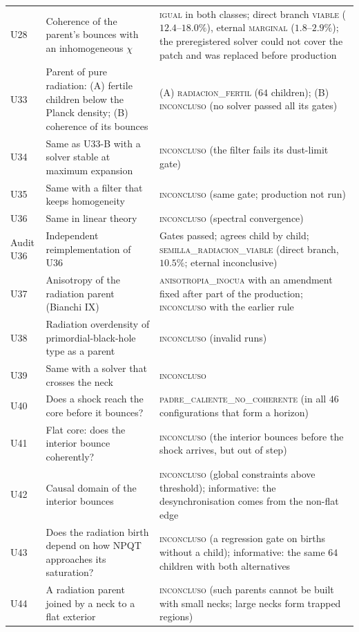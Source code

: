 \documentclass[11pt,a4paper]{article}
\begin{document}
\begin{small}
\begin{longtable}{L{1.3cm}L{6.0cm}L{7.0cm}}
U28 & Coherence of the parent's bounces with an inhomogeneous $\chi$ & \textsc{igual} in both classes; direct branch \textsc{viable} ($12.4$--$18.0\%$), eternal \textsc{marginal} ($1.8$--$2.9\%$); the preregistered solver could not cover the patch and was replaced before production \\
U33 & Parent of pure radiation: (A) fertile children below the Planck density; (B) coherence of its bounces & (A) \textsc{radiacion\_fertil} ($64$ children); (B) \textsc{inconcluso} (no solver passed all its gates) \\
U34 & Same as U33-B with a solver stable at maximum expansion & \textsc{inconcluso} (the filter fails its dust-limit gate) \\
U35 & Same with a filter that keeps homogeneity & \textsc{inconcluso} (same gate; production not run) \\
U36 & Same in linear theory & \textsc{inconcluso} (spectral convergence) \\
Audit U36 & Independent reimplementation of U36 & Gates passed; agrees child by child; \textsc{semilla\_radiacion\_viable} (direct branch, $10.5\%$; eternal inconclusive) \\
U37 & Anisotropy of the radiation parent (Bianchi IX) & \textsc{anisotropia\_inocua} with an amendment fixed after part of the production; \textsc{inconcluso} with the earlier rule \\
U38 & Radiation overdensity of primordial-black-hole type as a parent & \textsc{inconcluso} (invalid runs) \\
U39 & Same with a solver that crosses the neck & \textsc{inconcluso} \\
U40 & Does a shock reach the core before it bounces? & \textsc{padre\_caliente\_no\_coherente} (in all $46$ configurations that form a horizon) \\
U41 & Flat core: does the interior bounce coherently? & \textsc{inconcluso} (the interior bounces before the shock arrives, but out of step) \\
U42 & Causal domain of the interior bounces & \textsc{inconcluso} (global constraints above threshold); informative: the desynchronisation comes from the non-flat edge \\
U43 & Does the radiation birth depend on how NPQT approaches its saturation? & \textsc{inconcluso} (a regression gate on births without a child); informative: the same $64$ children with both alternatives \\
U44 & A radiation parent joined by a neck to a flat exterior & \textsc{inconcluso} (such parents cannot be built with small necks; large necks form trapped regions) \\

\end{longtable}
\end{small}
\end{document}
